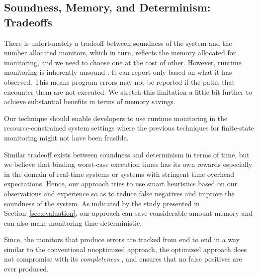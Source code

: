 \subsection{Soundness, Memory, and Determinism: Tradeoffs}
\label{subsec:tradeoff}

There is unfortunately a tradeoff between soundness of the system and the
number allocated monitors, which in turn, reflects the memory allocated for monitoring,  and we need to 
choose one at the cost of other. However, runtime monitoring is inherently 
unsound \cite{}. It can report only based on what it has observed. This means program errors 
may not be reported if the paths that encounter them are not executed. We 
stretch this limitation a little bit further to achieve substantial benefits in 
terms of memory savings.

Our technique should enable developers to use runtime 
monitoring in the resource-constrained system settings where the previous 
techniques for finite-state monitoring might not have been feasible.

Similar tradeoff exists between soundness and determinism in terms of time, but 
we believe that binding worst-case execution times has its own rewards 
especially in the domain of real-time systems or systems with stringent time overhead
expectations. Hence, our approach tries to use 
smart heuristics based on our observations and experience so as to reduce false 
negatives and improve the soundness of the system. As indicated by the study 
presented in Section~\ref{sec:evaluation}, our approach can save considerable amount 
memory and can also make monitoring time-deterministic.

Since, the monitors that produce errors are tracked from end to end in a way similar to the
conventional unoptimized approach, the optimized approach does not 
compromise with its \textit{completeness} , and ensures that no false positives 
are ever produced.


